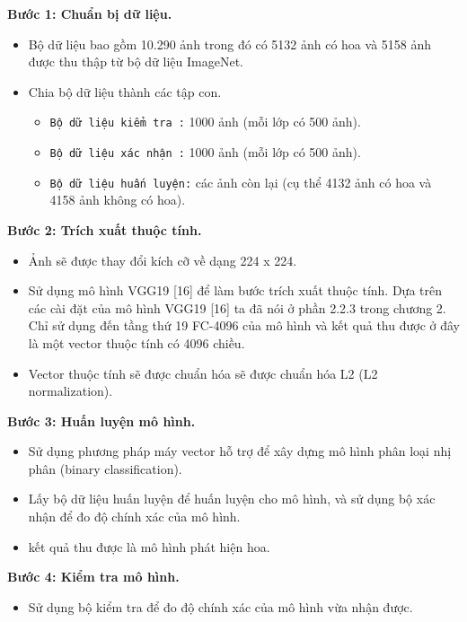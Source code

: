 \documentclass[12pt]{report}
\begin{document}
		\textbf{Bước 1: Chuẩn bị dữ liệu.} 
		\begin{itemize}
			\item Bộ dữ liệu bao gồm 10.290 ảnh trong đó có 5132 ảnh có hoa và 5158 ảnh được thu thập từ bộ dữ liệu ImageNet.
			\item Chia bộ dữ liệu thành các tập con.
			      \begin{itemize}
			      	\item \texttt{Bộ dữ liệu kiểm tra :} 1000 ảnh (mỗi lớp có 500 ảnh).
			      	\item \texttt{Bộ dữ liệu xác nhận :} 1000 ảnh (mỗi lớp có 500 ảnh).
			      	\item \texttt{Bộ dữ liệu huấn luyện:} các ảnh còn lại (cụ thể 4132 ảnh có hoa và 4158 ảnh không có hoa).
			      \end{itemize}
		\end{itemize}
										
		\textbf{Bước 2: Trích xuất thuộc tính.} 
		\begin{itemize}
			\item Ảnh sẽ được thay đổi kích cỡ về dạng 224 x 224.
			\item Sử dụng mô hình VGG19 [16] để làm bước trích xuất thuộc tính. Dựa trên các cài đặt của mô hình VGG19 [16] ta đã nói ở phần 2.2.3 trong chương 2. Chỉ sử dụng đến tầng thứ 19 FC-4096 của mô hình và kết quả thu được ở đây là một vector thuộc tính có 4096 chiều.
			\item Vector thuộc tính sẽ được chuẩn hóa sẽ được chuẩn hóa L2 (L2 normalization).
		\end{itemize}
						
		\textbf{Bước 3: Huấn luyện mô hình.} 
		\begin{itemize}
			\item Sử dụng phương pháp máy vector hỗ trợ để xây dựng mô hình phân loại nhị phân (binary classification). 
			\item Lấy bộ dữ liệu huấn luyện để huấn luyện cho mô hình, và sử dụng bộ xác nhận để đo độ chính xác của mô hình.
			\item kết quả thu được là mô hình phát hiện hoa.
			      			      			      
		\end{itemize}
						
		\textbf{Bước 4: Kiểm tra mô hình.} 
		\begin{itemize}
			\item Sử dụng bộ kiểm tra để đo độ chính xác của mô hình vừa nhận được.
		\end{itemize}
						
\end{document}
